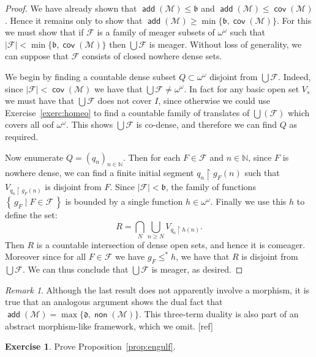 \documentclass[11pt,oneside]{amsbook}
\newcommand{\set}[1]{\left\{\,#1\,\right\}}
\newcommand{\NN}{\mathbb N}
\newcommand{\Meager}{\mathcal M}
\DeclareMathOperator{\add}{\mathsf{add}}
\DeclareMathOperator{\non}{\mathsf{non}}
\DeclareMathOperator{\cov}{\mathsf{cov}}
\theoremstyle{definition}
\newtheorem{exerc}{Exercise}[section]
\theoremstyle{plain}
\theoremstyle{definition}
\theoremstyle{remark}
\newtheorem{rem}[thm]{Remark}
\numberwithin{equation}{section}
\numberwithin{figure}{section}
\begin{document}
\begin{proof}
  We have already shown that $\add(\Meager)\leq\mathfrak b$ and $\add(\Meager)\leq\cov(\Meager)$. Hence it remains only to show that $\add(\Meager)\geq\min\{\mathfrak b,\cov(\Meager)\}$. For this we must show that if $\mathcal F$ is a family of meager subsets of $\omega^\omega$ such that $|\mathcal F|<\min\{\mathfrak b,\cov(\Meager)\}$ then $\bigcup\mathcal F$ is meager. Without loss of generality, we can suppose that $\mathcal F$ consists of closed nowhere dense sets.

  We begin by finding a countable dense subset $Q\subset\omega^\omega$ disjoint from $\bigcup\mathcal F$. Indeed, since $|\mathcal F|<\cov(\Meager)$ we have that $\bigcup\mathcal F\neq\omega^\omega$. In fact for any basic open set $V_s$ we must have that $\bigcup\mathcal F$ does not cover $I$, since otherwise we could use Exercise~\ref{exerc:homeo} to find a countable family of translates of $\bigcup(\mathcal F)$ which covers all oof $\omega^\omega$. This shows $\bigcup\mathcal F$ is co-dense, and therefore we can find $Q$ as required.

  Now enumerate $Q=(q_n)_{n\in\NN}$. Then for each $F\in\mathcal F$ and $n\in\NN$, since $F$ is nowhere dense, we can find a finite initial segment $q_n\restriction g_F(n)$ such that $V_{q_n\restriction g_F(n)}$ is disjoint from $F$. Since $|\mathcal F|<\mathfrak b$, the family of functions $\set{g_F\mid F\in\mathcal F}$ is bounded by a single function $h\in\omega^\omega$. Finally we use this $h$ to define the set:
  \[R=\bigcap_N\bigcup_{n\geq N}V_{q_n\restriction h(n)}\text{.}
  \]
  Then $R$ is a countable intersection of dense open sets, and hence it is comeager. Moreover since for all $F\in\mathcal F$ we have $g_F\leq^*h$, we have that $R$ is disjoint from $\bigcup\mathcal F$. We can thus conclude that $\bigcup\mathcal F$ is meager, as desired.
\end{proof}

\begin{rem}
  Although the last result does not apparently involve a morphism, it is true that an analogous argument shows the dual fact that $\add(\Meager)=\max\{\mathfrak d,\non(\Meager)\}$. This three-term duality is also part of an abstract morphism-like framework, which we omit. [ref]
\end{rem}

\begin{exerc}
  \label{exerc:engulf}
  Prove Proposition~\ref{prop:engulf}.
\end{exerc}
\end{document}

